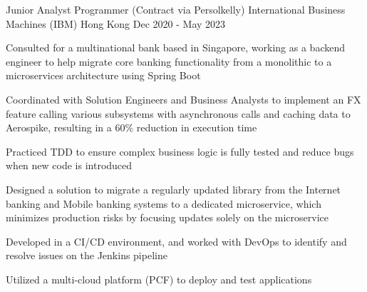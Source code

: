 
\begin{cventries}

  \cventry
    {Junior Analyst Programmer (Contract via Persolkelly)}
    {International Business Machines (IBM)}
    {Hong Kong}
    {Dec 2020 - May 2023}
    {
        \begin{cvitems}
          \item {Consulted for a multinational bank based in Singapore, working as a backend engineer to help migrate core banking functionality from a monolithic to a microservices architecture using Spring Boot}
          \item {Coordinated with Solution Engineers and Business Analysts to implement an FX feature calling various subsystems with asynchronous calls and caching data to Aerospike, resulting in a 60\% reduction in execution time}
          \item {Practiced TDD to ensure complex business logic is fully tested and reduce bugs when new code is introduced}
          \item {Designed a solution to migrate a regularly updated library from the Internet banking and Mobile banking systems to a dedicated microservice, which minimizes production risks by focusing updates solely on the microservice}
          \item {Developed in a CI/CD environment, and worked with DevOps to identify and resolve issues on the Jenkins pipeline}
          \item {Utilized a multi-cloud platform (PCF) to deploy and test applications}

\end{cvitems}}
\end{cventries}
